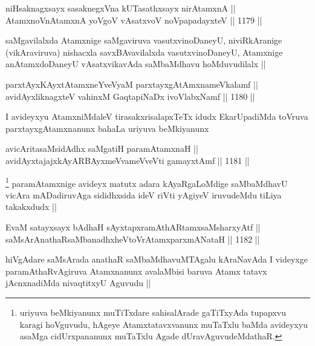 \begin{shl}
niHsaknagxsayx sasaknegxVna kUTasathxsayx nirAtamxnA || \\
AtamxnoV\s nAtamxnA yoVgoV vAsatxvoV noVpapadayxteV ||  1179 ||  
\end{shl}

\begin{artha}
saMgavilalxda Atamxnige saMgaviruva vasutxvinoDaneyU, niviRkAranige (vikAraviruva) nishacxla savxBAvavilalxda vasutxvinoDaneyU, Atamxnige anAtamxdoDaneyU vAsatxvikavAda saMbaMdhavu hoMduvudilalx ||
\end{artha}


\begin{shl}
parxtAyxKAyxtA\s \s tamxneYveVyaM parxtayxgAtAmxnameVkalamf || \\
avidAyx\s \s liknagxteV vahinxM GaqtapiNaDx ivoVlabxNamf ||  1180 ||  
\end{shl}

\begin{artha}
I avideyxyu AtamxniMdaleV tirasakxrisalapxTeTx idudx EkarUpadiMda toVruva parxtayxgAtamxnanunx bahaLa uriyuva beMkiyanunx 
\end{artha}

\begin{shl}
avicAritasaMsidAdhx saMgatiH paramAtamxnaH || \\
avidAyxtajajxkAyARBAyxmeVvameVveVti gamayxtAmf ||  1181 ||  
\end{shl}

\begin{artha}
\footnote{uriyuva beMkiyanunx muTiTxdare sahisalArade gaTiTxyAda tupapxvu karagi hoVguvudu, hAgeye Atamxtatavxvanunx muTaTxlu baMda avideyxyu asaMga cidUrxpananunx muTaTxlu Agade dUravAguvudeMdathaR.}
paramAtamxnige avideyx matutx adara kAyaRgaLoMdige saMbaMdhavU vicAra mADadiruvAga sididhxsida ideV riVti yAgiyeV iruvudeMdu tiLiya takakxdudx || 
\end{artha}

\begin{shl}
EvaM satayxsayx bAdhaH sAyxtapxramAthARtamxsaMsharxyAtf || \\
saMsArAnathaRsaMbanadhxheVtoVrAtamxparxmANataH ||  1182 ||  
\end{shl}

\begin{artha}
hiVgAdare saMsArada anathaR saMbaMdhavuMTAgalu kAraNavAda I videyxge paramAthaRvAgiruva Atamxnanunx avalaMbisi baruva Atamx tatavx jAcnxnadiMda nivaqtitxyU Aguvudu ||
\end{artha}

